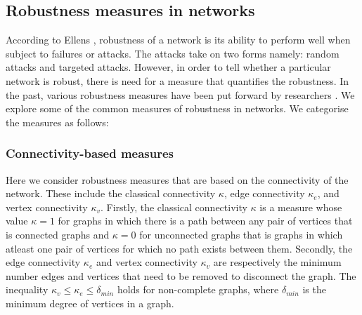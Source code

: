 \documentclass[10pt,a4paper]{article}
\begin{document}
	\subsection{Robustness measures in networks}
	According to Ellens \citep{ellens2013graph}, robustness of a network is its ability to perform well when subject to failures or attacks. The attacks take on two forms namely: random attacks and targeted attacks. However, in order to tell whether a particular network is robust, there is need for a measure that quantifies the robustness. In the past, various robustness measures have been put forward by researchers \citep{sydney2008elasticity}. We explore some of the common measures of robustness in networks. We categorise the measures as follows:
	\subsubsection{Connectivity-based measures}
	Here we consider robustness measures that are based on the connectivity of the network. These include the classical connectivity $\kappa$, edge connectivity $\kappa_e$, and vertex connectivity $\kappa_v$. Firstly, the classical connectivity $\kappa$ is a measure whose value $\kappa=1$ for graphs in which there is a path between any pair of vertices that is connected graphs and $\kappa=0$ for unconnected graphs that is graphs in which atleast one pair of vertices  for which no path exists between them. Secondly, the edge connectivity $\kappa_e$ and vertex connectivity $\kappa_v$ are respectively the minimum number edges and vertices that need to be removed to disconnect the graph. The inequality $\kappa_v \leq \kappa_e \leq \delta_{min}$ holds for non-complete graphs, where $\delta_{min}$ is the minimum degree of vertices in a graph.
\end{document}

